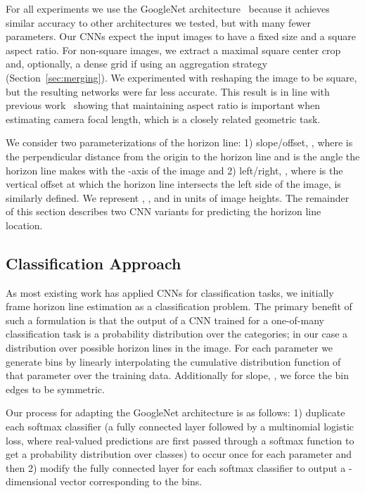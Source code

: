 \documentclass{bmvc2k}
\newcommand{\secref}[1]{Section~\ref{sec:#1}}
\begin{document}
For all experiments we use the GoogleNet
architecture~\cite{szegedy2015going} because it achieves similar
accuracy to other architectures we tested, but with many fewer
parameters. Our CNNs expect the input images to have a fixed size and
a square aspect ratio.  For non-square images, we extract a maximal
square center crop and, optionally, a dense
grid if using an aggregation strategy (\secref{merging}). We
experimented with reshaping the image to be square, but the resulting
networks were far less accurate. This result is in line with previous
work~\cite{workman2015deepfocal} showing that maintaining aspect
ratio is important when estimating camera focal length, which is a
closely related geometric task.

We consider two parameterizations of the
horizon line: 1) slope/offset, , where  is the
perpendicular distance from the origin to the horizon line and
 is the angle the horizon line makes with the -axis of the image and 2)
left/right, , where  is the vertical offset at which the
horizon line intersects the left side of the image,  is similarly
defined. We represent , , and  in units of image heights.
The remainder of this section describes two CNN variants for
predicting the horizon line location.

\subsection{Classification Approach}
\label{sec:classification}

As most existing work has applied CNNs for classification tasks, we
initially frame horizon line estimation as a classification problem.
The primary benefit of such a formulation is that the output of a CNN
trained for a one-of-many classification task is a probability
distribution over the categories; in our case a distribution over
possible horizon lines in the image. For each parameter we generate
 bins by linearly interpolating the cumulative distribution
function of that parameter over the training data. Additionally for
slope, , we force the bin edges to be symmetric. 

Our process for adapting the GoogleNet architecture is as follows: 1)
duplicate each softmax classifier (a fully connected layer followed by
a multinomial logistic loss, where real-valued predictions are first
passed through a softmax function to get a probability distribution
over classes) to occur once for each parameter and then 2) modify the
fully connected layer for each softmax classifier to output a
-dimensional vector corresponding to the  bins.
\end{document}
